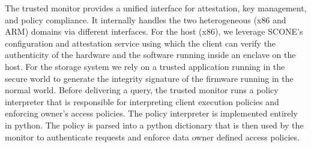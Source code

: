 The trusted monitor provides a unified interface for attestation, key management, and policy compliance.
It internally handles the two heterogeneous (x86 and ARM) domains via different interfaces. For the host (x86), we leverage SCONE's configuration and attestation service using which the client can verify the authenticity of the hardware and the software running inside an enclave on the host. For the storage system we rely on a trusted application running in the secure world to generate the integrity signature of the firmware running in the normal world. %
Before delivering a query, the trusted monitor runs a policy interpreter that is responsible for interpreting client execution policies and enforcing owner's access policies. The policy interpreter  is implemented entirely in python. The policy is parsed into a python dictionary that is then used by the monitor to authenticate requests and enforce data owner defined access policies.



